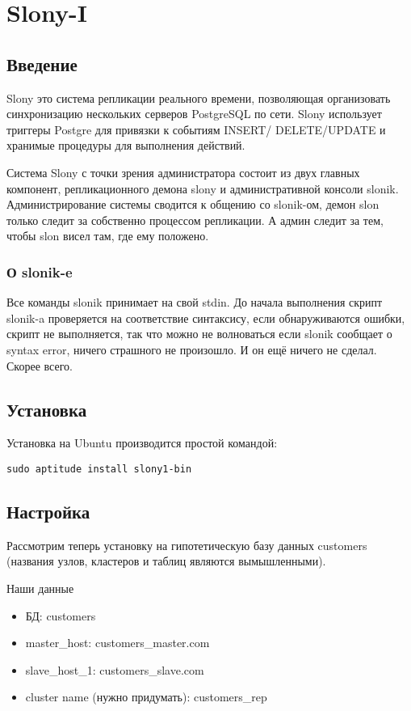 \section{Slony-I}
\subsection{Введение}
Slony это система репликации реального времени, позволяющая организовать синхронизацию нескольких серверов 
PostgreSQL по сети. Slony использует триггеры Postgre для привязки к событиям INSERT/ DELETE/UPDATE и 
хранимые процедуры для выполнения действий.

Система Slony с точки зрения администратора состоит из двух главных компонент, репликационного демона slony и 
административной консоли slonik. Администрирование системы сводится к общению со slonik-ом, демон slon только 
следит за собственно процессом репликации. А админ следит за тем, чтобы slon висел там, где ему положено. 

\subsubsection{О slonik-e}
Все команды slonik принимает на свой stdin. До начала выполнения скрипт slonik-a проверяется на соответствие синтаксису, 
если обнаруживаются ошибки, скрипт не выполняется, так что можно не волноваться если slonik сообщает о syntax error, 
ничего страшного не произошло. И он ещё ничего не сделал. Скорее всего. 

\subsection{Установка}
Установка на Ubuntu производится простой командой:
\begin{lstlisting}[label=lst:slony1,caption=Установка]
sudo aptitude install slony1-bin
\end{lstlisting}

\subsection{Настройка}
\label{sec:slonyI}
Рассмотрим теперь установку на гипотетическую базу данных customers 
(названия узлов, кластеров и таблиц являются вымышленными).

Наши данные
\begin{itemize}
\item БД: customers
\item master\_host: customers\_master.com
\item slave\_host\_1: customers\_slave.com
\item cluster name (нужно придумать): customers\_rep
\end{itemize}

